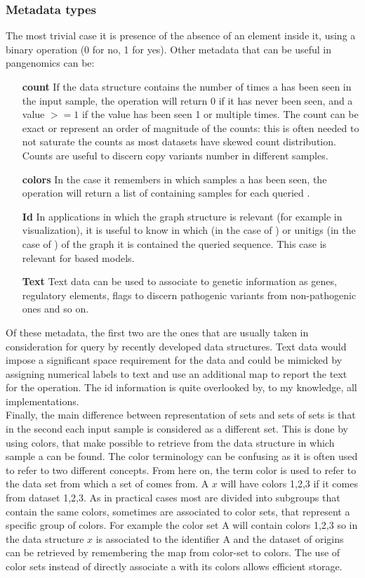 \subsubsection{Metadata types}
The most trivial case it is presence of the absence of an element inside it, using a binary \memb operation (0 for no, 1 for yes). Other metadata that can be useful in pangenomics can be:
\begin{itemize}
	\item[\textbf{count}] If the data structure contains the number of times a \kmer has been seen in the input sample, the \memb operation will return 0 if it has never been seen, and a value $>= 1$ if the value has been seen 1 or multiple times. The count can be exact or represent an order of magnitude of the counts: this is often needed to not saturate the counts as most datasets have skewed \kmer count distribution. Counts are useful to discern copy variants number in different samples.
	\item[\textbf{colors}] In the case it remembers in which samples a \kmer has been seen, the \memb operation will return a list of containing samples for each queried \kmer. 
	\item[\textbf{Id}] In applications in which the graph structure is relevant (for example in visualization), it is useful to know in which \kmers (in the case of \dbg) or unitigs (in the case of \cdbg) of the graph it is contained the queried sequence. This case is relevant for \dbg based models.
	\item[\textbf{Text}] Text data can be used to associate \kmers to genetic information as genes, regulatory elements, flags to discern pathogenic variants from non-pathogenic ones and so on.
\end{itemize}
Of these metadata, the first two are the ones that are usually taken in consideration for query by recently developed data structures. Text data would impose a significant space requirement for the data and could be mimicked by assigning numerical labels to text and use an additional map to report the text for the \memb operation. The id information is quite overlooked by, to my knowledge, all implementations.\\
Finally, the main difference between representation of \kmer sets and sets of \kmer sets is that in the second each input sample is considered as a different set. This is done by using colors, that make possible to retrieve from the data structure in which sample a \kmer can be found. The color terminology can be confusing as it is often used to refer to two different concepts. From here on, the term color is used to refer to the data set from which a set of \kmer comes from. A \kmer $x$ will have colors 1,2,3 if it comes from dataset 1,2,3. As in practical cases most \kmers are divided into subgroups that contain the same colors, sometimes \kmers are associated to color sets, that represent a specific group of colors. For example the color set A will contain colors 1,2,3 so in the data structure \kmer $x$ is associated to the identifier A and the dataset of origins can be retrieved by remembering the map from color-set to colors. The use of color sets instead of directly associate a \kmer with its colors allows efficient storage\cite{ggcat}. 

